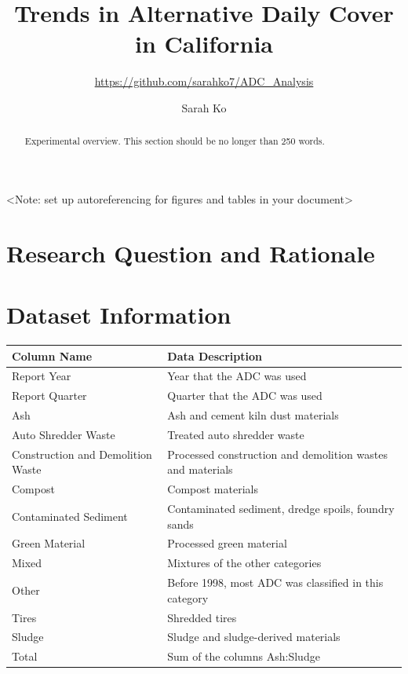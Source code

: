 \documentclass[12pt,]{article}
\title{Trends in Alternative Daily Cover in California}
\subtitle{\url{https://github.com/sarahko7/ADC_Analysis}}
\author{Sarah Ko}
\date{}
\begin{document}
\maketitle
\begin{abstract}
Experimental overview. This section should be no longer than 250 words.
\end{abstract}

\newpage

\tableofcontents 

\newpage

\listoftables 

\newpage

\listoffigures 

\newpage

\textless{}Note: set up autoreferencing for figures and tables in your
document\textgreater{}

\section{Research Question and
Rationale}\label{research-question-and-rationale}

\newpage

\section{Dataset Information}\label{anchor}

\begin{table}[H]
\centering
\begin{tabular}{l|l}
\hline
\textbf{Column Name} & \textbf{Data Description}\\
\hline
Report Year & Year that the ADC was used\\
\hline
Report Quarter & Quarter that the ADC was used\\
\hline
Ash & Ash and cement kiln dust materials\\
\hline
Auto Shredder Waste & Treated auto shredder waste\\
\hline
Construction and Demolition Waste & Processed construction and demolition wastes and materials\\
\hline
Compost & Compost materials\\
\hline
Contaminated Sediment & Contaminated sediment, dredge spoils, foundry sands\\
\hline
Green Material & Processed green material\\
\hline
Mixed & Mixtures of the other categories\\
\hline
Other & Before 1998, most ADC was classified in this category\\
\hline
Tires & Shredded tires\\
\hline
Sludge & Sludge and sludge-derived materials\\
\hline
Total & Sum of the columns Ash:Sludge\\
\hline
\end{tabular}
\end{table}
\end{document}
